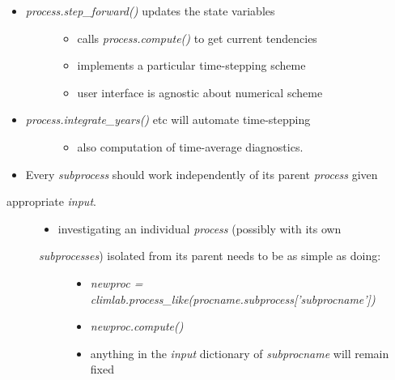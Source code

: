 \documentclass[letterpaper,10pt,english]{sphinxmanual}
\begin{document}
\begin{itemize}
\item {} \begin{description}
\item[{\emph{process.step\_forward()} updates the state variables}] \leavevmode\begin{itemize}
\item {} 
calls \emph{process.compute()} to get current tendencies

\item {} 
implements a particular time-stepping scheme

\item {} 
user interface is agnostic about numerical scheme

\end{itemize}

\end{description}

\item {} \begin{description}
\item[{\emph{process.integrate\_years()} etc will automate time-stepping}] \leavevmode\begin{itemize}
\item {} 
also computation of time-average diagnostics.

\end{itemize}

\end{description}

\item {} 
Every \emph{subprocess} should work independently of its parent \emph{process} given

\end{itemize}
\begin{description}
\item[{appropriate \emph{input}.}] \leavevmode\begin{itemize}
\item {} 
investigating an individual \emph{process} (possibly with its own

\end{itemize}
\begin{description}
\item[{\emph{subprocesses}) isolated from its parent needs to be as simple as doing:}] \leavevmode\begin{itemize}
\item {} 
\emph{newproc = climlab.process\_like(procname.subprocess{[}'subprocname'{]})}

\item {} 
\emph{newproc.compute()}

\item {} 
anything in the \emph{input} dictionary of \emph{subprocname} will remain fixed

\end{itemize}

\end{description}

\end{description}
\end{document}
